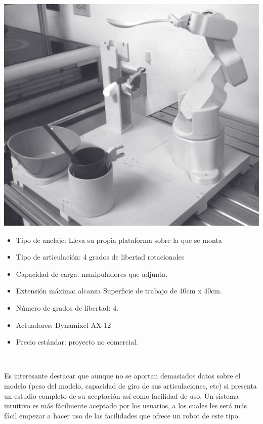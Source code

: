      \begin{minipage}{0.35\textwidth}
       \includegraphics[width=\linewidth]{figuras/Imagenes_EstadoArte/UPamplona.png}
     \end{minipage}
     \begin{minipage}{0.65\textwidth}\raggedright
       \hspace{1cm}
       \begin{itemize}
           \item Tipo de anclaje: Lleva su propia plataforma sobre la que se monta
           \item Tipo de articulación: 4 grados de libertad rotacionales
           \item Capacidad de carga: manipuladores que adjunta.
           \item Extensión máxima: alcanza Superficie de trabajo de 40cm x 40cm.
           \item Número de grados de libertad: 4.
           \item Actuadores: Dynamixel AX-12
           \item Precio estándar: proyecto no comercial.
       \end{itemize}
     \end{minipage}
     \\

     \vspace{0.1cm}

     Es interesante destacar que aunque no se aportan demasiados datos sobre el modelo (peso del modelo, capacidad de giro de sus articulaciones, etc) si presenta un estudio completo de su aceptación así como facilidad de uso. Un sistema intuitivo es más fácilmente aceptado por los usuarios, a los cuales les será más fácil empezar a hacer uso de las facilidades que ofrece un robot de este tipo.
     \\

